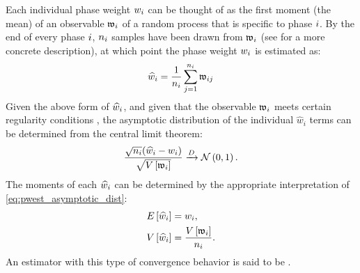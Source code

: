 Each individual  phase weight $w_{i}$ can be thought of as the first moment (\ie the mean) of an observable $\mathfrak{w}_{i}$ of a random process that is specific to phase $i$. By the end of every  phase $i$, $n_{i}$ samples have been drawn from $\mathfrak{w}_{i}$ (see  for a more concrete description), at which point the phase weight $w_{i}$ is estimated as:
    \begin{equation*}
        \widehat{w}_{i} = \frac{1}{n_{i}} \sum_{j=1}^{n_{i}} \mathfrak{w}_{i j}
    \end{equation*}
Given the above form of $\widehat{w}_{i}$, and given that the observable $\mathfrak{w}_{i}$ meets certain regularity conditions \supercite{Oehlert:1992gp}, the asymptotic distribution of the individual $\widehat{w}_i$ terms can be determined from the central limit theorem:
    \begin{equation}
    \label{eq:pwest_asymptotic_dist}
        \frac{\sqrt{n_i} (\widehat{w}_i - w_i)}{\sqrt{V \left[ \mathfrak{w}_{i} \right]}} \xrightarrow{D} \mathcal{N}\left( 0 , 1 \right).
    \end{equation}
The moments of each $\widehat{w}_{i}$ can be determined by the appropriate interpretation of \eqref{eq:pwest_asymptotic_dist}:
    \begin{align}
    \label{eq:pwest_moments}
        \begin{split}
            E \left[ \widehat{w}_i \right] &= w_i, \\
            V \left[ \widehat{w}_i \right] &= \frac{V \left[ \mathfrak{w}_{i} \right]}{n_i}.
        \end{split}
    \end{align}
An estimator with this type of convergence behavior is said to be \ncon.

